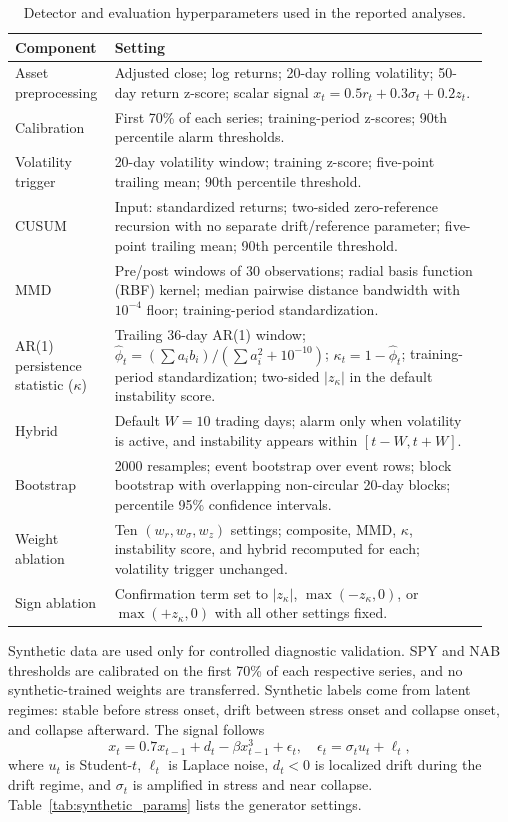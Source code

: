 \documentclass[pdflatex,sn-mathphys-num,iicol]{sn-jnl}
\begin{document}
\begin{appendices}
\begin{table}[t]
\centering
\caption{Detector and evaluation hyperparameters used in the reported analyses.}
\label{tab:hyperparams}
\scriptsize
\begin{tabular}{p{0.18\linewidth}p{0.76\linewidth}}
\toprule
Component & Setting \\
\midrule
Asset preprocessing & Adjusted close; log returns; 20-day rolling volatility; 50-day return z-score; scalar signal $x_t=0.5r_t+0.3\sigma_t+0.2z_t$.\\
Calibration & First 70\% of each series; training-period z-scores; 90th percentile alarm thresholds.\\
Volatility trigger & 20-day volatility window; training z-score; five-point trailing mean; 90th percentile threshold.\\
CUSUM & Input: standardized returns; two-sided zero-reference recursion with no separate drift/reference parameter; five-point trailing mean; 90th percentile threshold.\\
MMD & Pre/post windows of 30 observations; radial basis function (RBF) kernel; median pairwise distance bandwidth with $10^{-4}$ floor; training-period standardization.\\
AR(1) persistence statistic ($\kappa$) & Trailing 36-day AR(1) window; $\widehat\phi_t=(\sum a_i b_i)/(\sum a_i^2+10^{-10})$; $\kappa_t=1-\widehat\phi_t$; training-period standardization; two-sided $|z_\kappa|$ in the default instability score.\\
Hybrid & Default $W=10$ trading days; alarm only when volatility is active, and instability appears within $[t-W,t+W]$.\\
Bootstrap & 2000 resamples; event bootstrap over event rows; block bootstrap with overlapping non-circular 20-day blocks; percentile 95\% confidence intervals.\\
Weight ablation & Ten $(w_r,w_\sigma,w_z)$ settings; composite, MMD, $\kappa$, instability score, and hybrid recomputed for each; volatility trigger unchanged.\\
Sign ablation & Confirmation term set to $|z_\kappa|$, $\max(-z_\kappa,0)$, or $\max(+z_\kappa,0)$ with all other settings fixed.\\
\bottomrule
\end{tabular}
\end{table}

Synthetic data are used only for controlled diagnostic validation. SPY and NAB thresholds are calibrated on the first 70\% of each respective series, and no synthetic-trained weights are transferred. Synthetic labels come from latent regimes: stable before stress onset, drift between stress onset and collapse onset, and collapse afterward. The signal follows
\begin{equation}
x_t=0.7x_{t-1}+d_t-\beta x_{t-1}^3+\epsilon_t,\quad
\epsilon_t=\sigma_t u_t+\ell_t,
\end{equation}
where $u_t$ is Student-$t$, $\ell_t$ is Laplace noise, $d_t<0$ is localized drift during the drift regime, and $\sigma_t$ is amplified in stress and near collapse. Table~\ref{tab:synthetic_params} lists the generator settings.


\end{appendices}
\end{document}
